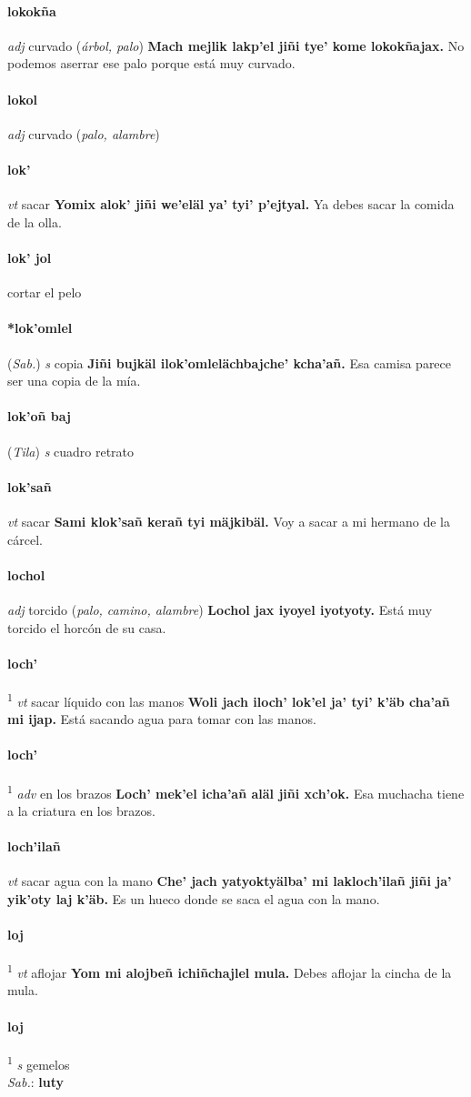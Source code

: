 \documentclass{scrbook}
\newcommand{\entry}[1]{\paragraph{#1}}
\newcommand{\defsuperscript}[1]{\textsuperscript{1}}
\newcommand{\partofspeech}[1]{\textit{#1}}
\newcommand{\spanishtranslation}[1]{#1}
\newcommand{\clarification}[1]{(\textit{#1})}
\newcommand{\cholexample}[1]{\textbf{#1}}
\newcommand{\exampletranslation}[1]{#1}
\newcommand{\dialectvariant}[1]{\\\textit{#1}:}
\newcommand{\dialectword}[1]{\textbf{#1}}
\newcommand{\relevantdialect}[1]{(\textit{#1})}
\begin{document}
\begin{multicols}{2}
\entry{lokokña}
\partofspeech{adj}
\spanishtranslation{curvado}
\clarification{árbol, palo}
\cholexample{Mach mejlik lakp'el jiñi tye' kome lokokñajax.}
\exampletranslation{No podemos aserrar ese palo porque está muy curvado.}

\entry{lokol}
\partofspeech{adj}
\spanishtranslation{curvado}
\clarification{palo, alambre}

\entry{lok'}
\partofspeech{vt}
\spanishtranslation{sacar}
\cholexample{Yomix alok' jiñi we'eläl ya' tyi' p'ejtyal.}
\exampletranslation{Ya debes sacar la comida de la olla.}

\entry{lok' jol}
\spanishtranslation{cortar el pelo}

\entry{*lok'omlel}
\relevantdialect{Sab.}
\partofspeech{s}
\spanishtranslation{copia}
\cholexample{Jiñi bujkäl ilok'omlelächbajche' kcha'añ.}
\exampletranslation{Esa camisa parece ser una copia de la mía.}

\entry{lok'oñ baj}
\relevantdialect{Tila}
\partofspeech{s}
\spanishtranslation{cuadro}
\spanishtranslation{retrato}

\entry{lok'sañ}
\partofspeech{vt}
\spanishtranslation{sacar}
\cholexample{Sami klok'sañ kerañ tyi mäjkibäl.}
\exampletranslation{Voy a sacar a mi hermano de la cárcel.}

\entry{lochol}
\partofspeech{adj}
\spanishtranslation{torcido}
\clarification{palo, camino, alambre}
\cholexample{Lochol jax iyoyel iyotyoty.}
\exampletranslation{Está muy torcido el horcón de su casa.}

\entry{loch'}
\defsuperscript{1}
\partofspeech{vt}
\spanishtranslation{sacar líquido con las manos}
\cholexample{Woli jach iloch' lok'el ja' tyi' k'äb cha'añ mi ijap.}
\exampletranslation{Está sacando agua para tomar con las manos.}

\entry{loch'}
\defsuperscript{2}
\partofspeech{adv}
\spanishtranslation{en los brazos}
\cholexample{Loch' mek'el icha'añ aläl jiñi xch'ok.}
\exampletranslation{Esa muchacha tiene a la criatura en los brazos.}

\entry{loch'ilañ}
\partofspeech{vt}
\spanishtranslation{sacar agua con la mano}
\cholexample{Che' jach yatyoktyälba' mi lakloch'ilañ jiñi ja' yik'oty laj k'äb.}
\exampletranslation{Es un hueco donde se saca el agua con la mano.}

\entry{loj}
\defsuperscript{1}
\partofspeech{vt}
\spanishtranslation{aflojar}
\cholexample{Yom mi alojbeñ ichiñchajlel mula.}
\exampletranslation{Debes aflojar la cincha de la mula.}

\entry{loj}
\defsuperscript{2}
\partofspeech{s}
\spanishtranslation{gemelos}
\dialectvariant{Sab.}
\dialectword{luty}


\end{multicols}
\end{document}
